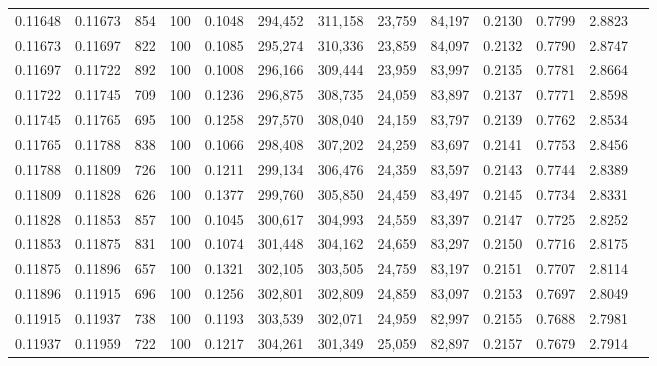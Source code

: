 \begin{tabular}{rrrrrrrrrrrrr}
0.11648 & 0.11673 &   854 & 100 &                                     0.1048 & 294,452 & 311,158 &  23,759 &  84,197 & 0.2130 & 0.7799 & 2.8823 \\
0.11673 & 0.11697 &   822 & 100 &                                     0.1085 & 295,274 & 310,336 &  23,859 &  84,097 & 0.2132 & 0.7790 & 2.8747 \\
0.11697 & 0.11722 &   892 & 100 &                                     0.1008 & 296,166 & 309,444 &  23,959 &  83,997 & 0.2135 & 0.7781 & 2.8664 \\
0.11722 & 0.11745 &   709 & 100 &                                     0.1236 & 296,875 & 308,735 &  24,059 &  83,897 & 0.2137 & 0.7771 & 2.8598 \\
0.11745 & 0.11765 &   695 & 100 &                                     0.1258 & 297,570 & 308,040 &  24,159 &  83,797 & 0.2139 & 0.7762 & 2.8534 \\
0.11765 & 0.11788 &   838 & 100 &                                     0.1066 & 298,408 & 307,202 &  24,259 &  83,697 & 0.2141 & 0.7753 & 2.8456 \\
0.11788 & 0.11809 &   726 & 100 &                                     0.1211 & 299,134 & 306,476 &  24,359 &  83,597 & 0.2143 & 0.7744 & 2.8389 \\
0.11809 & 0.11828 &   626 & 100 &                                     0.1377 & 299,760 & 305,850 &  24,459 &  83,497 & 0.2145 & 0.7734 & 2.8331 \\
0.11828 & 0.11853 &   857 & 100 &                                     0.1045 & 300,617 & 304,993 &  24,559 &  83,397 & 0.2147 & 0.7725 & 2.8252 \\
0.11853 & 0.11875 &   831 & 100 &                                     0.1074 & 301,448 & 304,162 &  24,659 &  83,297 & 0.2150 & 0.7716 & 2.8175 \\
0.11875 & 0.11896 &   657 & 100 &                                     0.1321 & 302,105 & 303,505 &  24,759 &  83,197 & 0.2151 & 0.7707 & 2.8114 \\
0.11896 & 0.11915 &   696 & 100 &                                     0.1256 & 302,801 & 302,809 &  24,859 &  83,097 & 0.2153 & 0.7697 & 2.8049 \\
0.11915 & 0.11937 &   738 & 100 &                                     0.1193 & 303,539 & 302,071 &  24,959 &  82,997 & 0.2155 & 0.7688 & 2.7981 \\
0.11937 & 0.11959 &   722 & 100 &                                     0.1217 & 304,261 & 301,349 &  25,059 &  82,897 & 0.2157 & 0.7679 & 2.7914 \\

\end{tabular}
